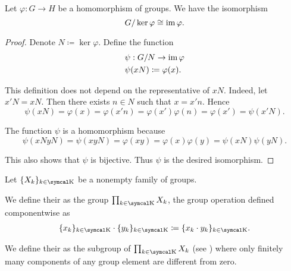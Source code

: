 \begin{Theorem}\label{thm:homomorphism_theorem_for_groups}
  Let \( \varphi: G \to H \) be a homomorphism of groups. We have the isomorphism
  \begin{equation*}
    G / \ker \varphi \cong \operatorname{im} \varphi.
  \end{equation*}
\end{Theorem}
\begin{proof}
  Denote \( N \coloneqq \ker \varphi \). Define the function
  \begin{align*}
    &\psi: G / N \to \operatorname{im} \varphi \\
    &\psi(xN) \coloneqq \varphi(x).
  \end{align*}

  This definition does not depend on the representative of \( xN \). Indeed, let \( x'N = xN \). Then there exists \( n \in N \) such that \( x = x' n \). Hence
  \begin{equation*}
    \psi(xN) = \varphi(x) = \varphi(x' n) = \varphi(x') \varphi(n) = \varphi(x') = \psi(x'N).
  \end{equation*}

  The function \( \psi \) is a homomorphism because
  \begin{equation*}
    \psi(xN yN) = \psi(xyN) = \varphi(xy) = \varphi(x) \varphi(y) = \psi(xN) \psi(yN).
  \end{equation*}

  This also shows that \( \psi \) is bijective. Thus \( \psi \) is the desired isomorphism.
\end{proof}

\begin{Definition}\label{def:group_direct_product}
  Let \( \{ X_k \}_{k \in \CK} \) be a nonempty family of groups.

  We define their  as the group \( \prod_{k \in \CK} X_k \), the group operation defined componentwise as
  \begin{align*}
    \{ x_k \}_{k \in \CK} \cdot \{ y_k \}_{k \in \CK}
    \coloneqq
    \{ x_k \cdot y_k \}_{k \in \CK}.
  \end{align*}

  We define their  as the subgroup of \( \prod_{k \in \CK} X_k \) (see ) where only finitely many components of any group element are different from zero.
\end{Definition}

